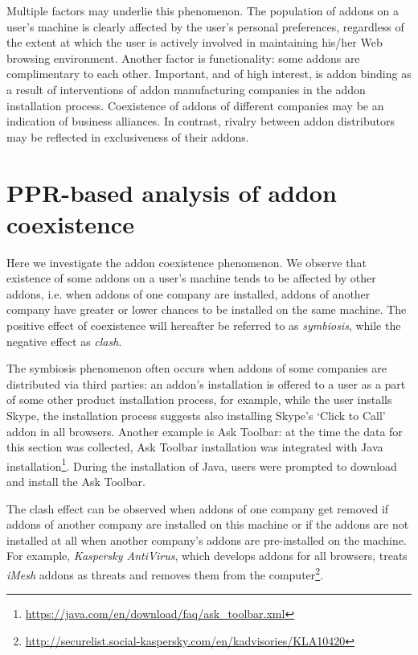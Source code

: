 \documentclass[ijoc,nonblindrev]{informs3} %
\numberwithin{equation}{subsection}
\begin{document}
Multiple factors may underlie this phenomenon. The population of addons on a user's machine is clearly affected by the user's personal preferences, regardless of the extent at which the user is actively involved in maintaining his/her Web browsing environment. Another factor is functionality: some addons are complimentary to each other. Important, and of high interest, is addon binding as a result of interventions of addon manufacturing companies in the addon installation process. Coexistence of addons of different companies may be an indication of business alliances. In contrast, rivalry between addon distributors may be reflected in exclusiveness of their addons. 

\section{PPR-based analysis of addon coexistence}
\label{chap:Symbiosis}

Here we investigate the addon coexistence phenomenon. We observe that existence of some addons on a user's machine tends to be affected by other addons, i.e. when addons of one company are installed, addons of another company have greater or lower chances to be installed on the same machine. The positive effect of coexistence will hereafter be referred to as \emph{symbiosis}, while the negative effect as \emph{clash}.

The symbiosis phenomenon often occurs when addons of some companies are distributed via third parties: an addon's installation is offered to a user as a part of some other product installation process, for example, while the user installs Skype, the installation process suggests also installing Skype's `Click to Call' addon in all browsers. Another example is Ask Toolbar: at the time the data for this section was collected, Ask Toolbar installation was integrated with Java installation\footnote{\url{https://java.com/en/download/faq/ask_toolbar.xml}}. During the installation of Java, users were prompted to download and install the Ask Toolbar.

The clash effect can be observed when addons of one company get removed if addons of another company are installed on this machine or if the addons are not installed at all when another company's addons are pre-installed on the machine. For example, \emph{Kaspersky AntiVirus}, which develops addons for all browsers, treats \emph{iMesh} addons as threats and removes them from the computer\footnote{\url{http://securelist.social-kaspersky.com/en/kadvisories/KLA10420}}.
\end{document}
